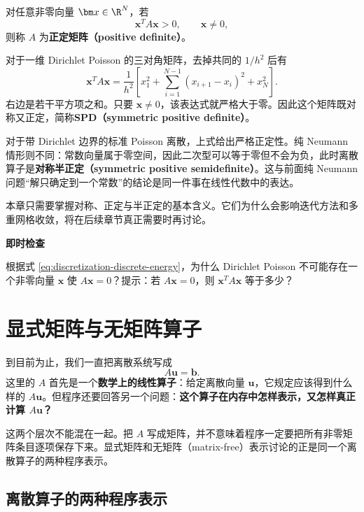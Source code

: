 对任意非零向量 $\bm x\in\R^N$，若
\begin{equation}
\bm x^TA\bm x>0,
\qquad \bm x\neq0,
\end{equation}
则称 $A$ 为\textbf{正定矩阵（positive definite）}。

对于一维 Dirichlet Poisson 的三对角矩阵，去掉共同的 $1/h^2$ 后有
\begin{equation}
\bm x^TA\bm x
=\frac1{h^2}\left[
 x_1^2
 +\sum_{i=1}^{N-1}(x_{i+1}-x_i)^2
 +x_N^2
\right].
\label{eq:discretization-discrete-energy}
\end{equation}
右边是若干平方项之和。只要 $\bm x\neq0$，该表达式就严格大于零。因此这个矩阵既对称又正定，简称\textbf{SPD（symmetric positive definite）}。

对于带 Dirichlet 边界的标准 Poisson 离散，上式给出严格正定性。纯 Neumann 情形则不同：常数向量属于零空间，因此二次型可以等于零但不会为负，此时离散算子是\textbf{对称半正定（symmetric positive semidefinite）}。这与前面纯 Neumann 问题“解只确定到一个常数”的结论是同一件事在线性代数中的表达。

本章只需要掌握对称、正定与半正定的基本含义。它们为什么会影响迭代方法和多重网格收敛，将在后续章节真正需要时再讨论。

\begin{checkpointbox}
\textbf{即时检查}

根据式 \eqref{eq:discretization-discrete-energy}，为什么 Dirichlet Poisson 不可能存在一个非零向量 $\bm x$ 使 $A\bm x=0$？提示：若 $A\bm x=0$，则 $\bm x^TA\bm x$ 等于多少？
\end{checkpointbox}


\section{显式矩阵与无矩阵算子}

到目前为止，我们一直把离散系统写成
\begin{equation}
A\bm u=\bm b.
\end{equation}
这里的 $A$ 首先是一个\textbf{数学上的线性算子}：给定离散向量 $\bm u$，它规定应该得到什么样的 $A\bm u$。但程序还要回答另一个问题：\textbf{这个算子在内存中怎样表示，又怎样真正计算 $A\bm u$？}

这两个层次不能混在一起。把 $A$ 写成矩阵，并不意味着程序一定要把所有非零矩阵条目逐项保存下来。显式矩阵和无矩阵（matrix-free）表示讨论的正是同一个离散算子的两种程序表示。

\subsection{离散算子的两种程序表示}


